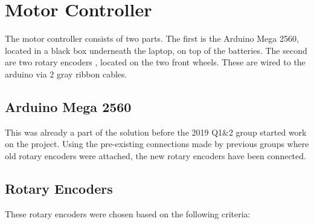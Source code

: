 \section{Motor Controller}
The motor controller consists of two parts.
The first is the Arduino Mega 2560, located in a black box underneath the laptop, on top of the batteries.
The second are two rotary encoders \cite{roten}, located on the two front wheels.
These are wired to the arduino via 2 gray ribbon cables.

\subsection{Arduino Mega 2560}
This was already a part of the solution before the 2019 Q1&2 group started work on the project.
Using the pre-existing connections made by previous groups where old rotary encoders were attached, the new rotary encoders have been connected.

\subsection{Rotary Encoders}
These rotary encoders were chosen based on the following criteria:

